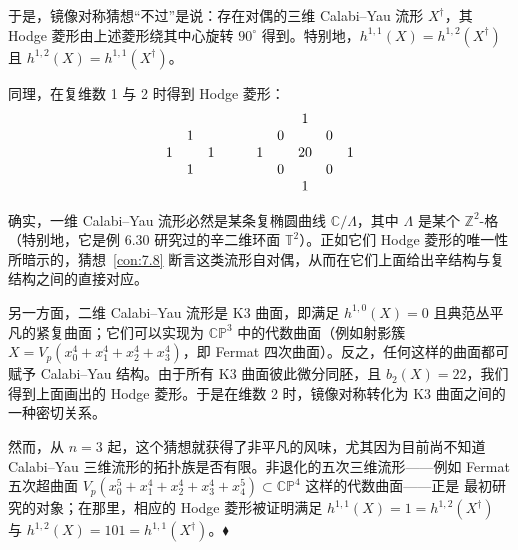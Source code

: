 于是，镜像对称猜想“不过”是说：存在对偶的三维 Calabi–Yau 流形 $X^\dagger$，其 Hodge 菱形由上述菱形绕其中心旋转 $90^\circ$ 得到。特别地，$h^{1,1}(X)=h^{1,2}(X^\dagger)$ 且 $h^{1,2}(X)=h^{1,1}(X^\dagger)$。

同理，在复维数 1 与 2 时得到 Hodge 菱形：
\begin{equation}\label{eq:7.108}
\begin{array}{c@{\qquad}c}
\begin{array}{ccc}
& 1 & \\
1 & & 1 \\
& 1 &
\end{array}
&
\begin{array}{ccccc}
& & 1 & & \\
& 0 & & 0 & \\
1 & & 20 & & 1 \\
& 0 & & 0 & \\
& & 1 & &
\end{array}
\end{array}
\end{equation}

确实，一维 Calabi–Yau 流形必然是某条复椭圆曲线 $\mathbb C/\Lambda$，其中 $\Lambda$ 是某个 $\mathbb Z^2$-格（特别地，它是例 6.30 研究过的辛二维环面 $\mathbb T^2$）。正如它们 Hodge 菱形的唯一性所暗示的，猜想~\ref{con:7.8} 断言这类流形自对偶，从而在它们上面给出辛结构与复结构之间的直接对应。

另一方面，二维 Calabi–Yau 流形是 K3 曲面，即满足 $h^{1,0}(X)=0$ 且典范丛平凡的紧复曲面；它们可以实现为 $\mathbb{CP}^3$ 中的代数曲面（例如射影簇 $X=V_p(x_0^4+x_1^4+x_2^4+x_3^4)$，即 Fermat 四次曲面）。反之，任何这样的曲面都可赋予 Calabi–Yau 结构。由于所有 K3 曲面彼此微分同胚，且 $b_2(X)=22$，我们得到上面画出的 Hodge 菱形。于是在维数 2 时，镜像对称转化为 K3 曲面之间的一种密切关系。

然而，从 $n=3$ 起，这个猜想就获得了非平凡的风味，尤其因为目前尚不知道 Calabi–Yau 三维流形的拓扑族是否有限。非退化的五次三维流形——例如 Fermat 五次超曲面 $V_p(x_0^5+x_1^4+x_2^4+x_3^4+x_4^5)\subset\mathbb{CP}^4$ 这样的代数曲面——正是 \cite{CdGP91} 最初研究的对象；在那里，相应的 Hodge 菱形被证明满足 $h^{1,1}(X)=1=h^{1,2}(X^\dagger)$ 与 $h^{1,2}(X)=101=h^{1,1}(X^\dagger)$。\hfill$\blacklozenge$


